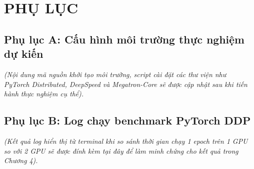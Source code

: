 \section*{PHỤ LỤC}

\subsection*{Phụ lục A: Cấu hình môi trường thực nghiệm dự kiến}
\textit{(Nội dung mã nguồn khởi tạo môi trường, script cài đặt các thư viện như PyTorch Distributed, DeepSpeed và Megatron-Core sẽ được cập nhật sau khi tiến hành thực nghiệm cụ thể).}

\subsection*{Phụ lục B: Log chạy benchmark PyTorch DDP}
\textit{(Kết quả log hiển thị từ terminal khi so sánh thời gian chạy 1 epoch trên 1 GPU so với 2 GPU sẽ được đính kèm tại đây để làm minh chứng cho kết quả trong Chương 4).}
\cleardoublepage
